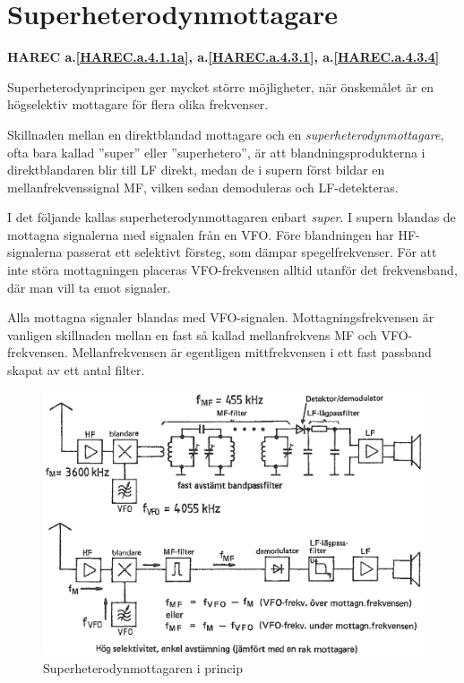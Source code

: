 \section{Superheterodynmottagare}
\textbf{
HAREC a.\ref{HAREC.a.4.1.1a}\label{myHAREC.a.4.1.1a},
 a.\ref{HAREC.a.4.3.1}\label{myHAREC.a.4.3.1},
 a.\ref{HAREC.a.4.3.4}\label{myHAREC.a.4.3.4}
}

Superheterodynprincipen ger mycket större möjligheter, när önskemålet
är en högselektiv mottagare för flera olika frekvenser.

Skillnaden mellan en direktblandad mottagare och en
\emph{superheterodynmottagare}, ofta bara kallad ''super'' eller
''superhetero'', är att blandningsprodukterna i direktblandaren blir till
LF direkt, medan de i supern först bildar en mellanfrekvenssignal MF,
vilken sedan demoduleras och LF-detekteras.

I det följande kallas superheterodynmottagaren enbart \emph{super}.
I supern blandas de mottagna signalerna med signalen från en VFO.
Före blandningen har HF-signalerna passerat ett selektivt försteg, som
dämpar spegelfrekvenser.
För att inte störa mottagningen placeras VFO-frekvensen alltid utanför
det frekvensband, där man vill ta emot signaler.

Alla mottagna signaler blandas med VFO-signalen.
Mottagningsfrekvensen är vanligen skillnaden mellan en fast så kallad
mellanfrekvens MF och VFO-frekvensen.
Mellanfrekvensen är egentligen mittfrekvensen i ett fast passband skapat av
ett antal filter.

\begin{figure}
  \includegraphics[width=\textwidth]{images/cropped_pdfs/bild_2_4-13.pdf}
  \caption{Superheterodynmottagaren i princip}
  \label{fig:bildII4-13}
\end{figure}

